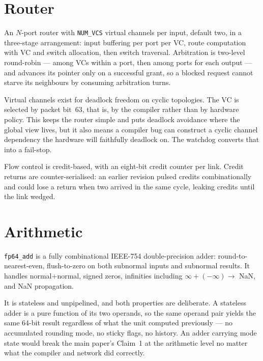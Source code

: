 \documentclass[journal,10pt]{IEEEtran}
\newcommand{\sv}[1]{\texttt{#1}}
\begin{document}
\section{Router}\label{sec:vc}

An $N$-port router with \sv{NUM\_VCS} virtual channels per input, default
two, in a three-stage arrangement: input buffering per port per VC, route
computation with VC and switch allocation, then switch traversal. Arbitration
is two-level round-robin --- among VCs within a port, then among ports for
each output --- and advances its pointer only on a successful grant, so a
blocked request cannot starve its neighbours by consuming arbitration turns.

Virtual channels exist for deadlock freedom on cyclic topologies. The VC is
selected by packet bit~63, that is, by the compiler rather than by hardware
policy. This keeps the router simple and puts deadlock avoidance where the
global view lives, but it also means a compiler bug can construct a cyclic
channel dependency the hardware will faithfully deadlock on. The watchdog
converts that into a fail-stop.

Flow control is credit-based, with an eight-bit credit counter per link.
Credit returns are counter-serialised: an earlier revision pulsed credits
combinationally and could lose a return when two arrived in the same cycle,
leaking credits until the link wedged.

\section{Arithmetic}

\sv{fp64\_add} is a fully combinational IEEE-754 double-precision adder:
round-to-nearest-even, flush-to-zero on both subnormal inputs and subnormal
results. It handles normal$+$normal, signed zeros, infinities including
$\infty + (-\infty) \rightarrow$ NaN, and NaN propagation.

It is stateless and unpipelined, and both properties are deliberate. A
stateless adder is a pure function of its two operands, so the same operand
pair yields the same 64-bit result regardless of what the unit computed
previously --- no accumulated rounding mode, no sticky flags, no history. An
adder carrying mode state would break the main paper's Claim~1 at the
arithmetic level no matter what the compiler and network did correctly.
\end{document}
